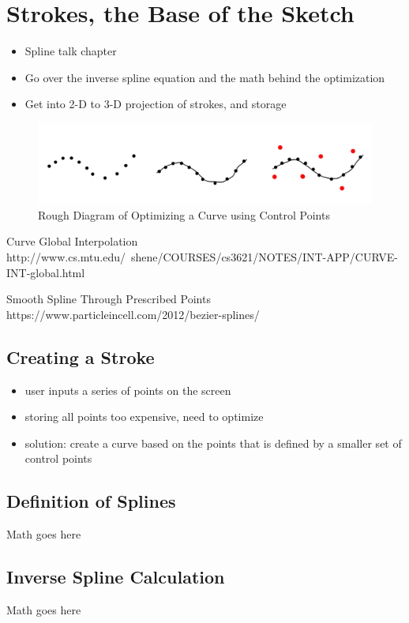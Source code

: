 \documentclass[12pt]{article}
\begin{document}
\pagebreak

\section{Strokes, the Base of the Sketch}

\begin{itemize}
\item Spline talk chapter
\item Go over the inverse spline equation and the math behind the optimization
\item Get into 2-D to 3-D projection of strokes, and storage
\end{itemize}

\begin{figure}
\includegraphics[width=0.9\linewidth]{CreatingACurve}
\caption{Rough Diagram of Optimizing a Curve using Control Points}
\end{figure}

Curve Global Interpolation http://www.cs.mtu.edu/~shene/COURSES/cs3621/NOTES/INT-APP/CURVE-INT-global.html

Smooth Spline Through Prescribed Points https://www.particleincell.com/2012/bezier-splines/

\subsection{Creating a Stroke}
\begin{itemize}
\item user inputs a series of points on the screen
\item storing all points too expensive, need to optimize
\item solution: create a curve based on the points that is defined by a smaller set of control points
\end{itemize}

\subsection{Definition of Splines}

Math goes here

\subsection{Inverse Spline Calculation}
Math goes here
\end{document}

